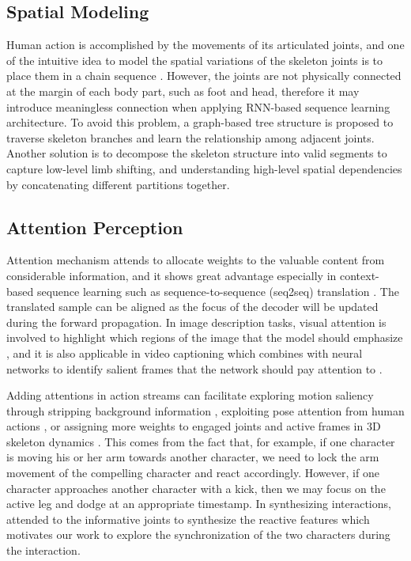 \documentclass[times,twocolumn,final]{elsarticle}
\begin{document}
\subsection{Spatial Modeling} 
Human action is accomplished by the movements of its articulated joints, and one of the intuitive idea to model the spatial variations of the skeleton joints is to place them in a chain sequence \cite{li2018co}. However, the joints are not physically connected at the margin of each body part, such as foot and head, therefore it may introduce meaningless connection when applying RNN-based sequence learning architecture. To avoid this problem, a graph-based tree structure is proposed \cite{liu2016spatio} to traverse skeleton branches and learn the relationship among adjacent joints. Another solution is to decompose the skeleton structure into valid segments \cite{si2018skeleton,wang21spatiotemporal} to capture low-level limb shifting, and understanding high-level spatial dependencies by concatenating different partitions together.

\subsection{Attention Perception} 
Attention mechanism attends to allocate weights to the valuable content from considerable information, and it shows great advantage especially in context-based sequence learning such as sequence-to-sequence (seq2seq) translation \cite{chiu2018state}. The translated sample can be aligned as the focus of the decoder will be updated during the forward propagation. In image description tasks, visual attention is involved to highlight which regions of the image that the model should emphasize \cite{song2018pixels}, and it is also applicable in video captioning which combines with neural networks to identify salient frames that the network should pay attention to \cite{gao2017video}. 

Adding attentions in action streams can facilitate exploring motion saliency through stripping background information \cite{sharma2015action}, exploiting pose attention from human actions \cite{du2017rpan}, or assigning more weights to engaged joints and active frames in 3D skeleton dynamics \cite{liu2018skeleton}. This comes from the fact that, for example, if one character is moving his or her arm towards another character, we need to lock the arm movement of the compelling character and react accordingly. However, if one character approaches another character with a kick, then we may focus on the active leg and dodge at an appropriate timestamp. In synthesizing interactions, \cite{baruah2020multimodal} attended to the informative joints to synthesize the reactive features which motivates our work to explore the synchronization of the two characters during the interaction.
\end{document}
